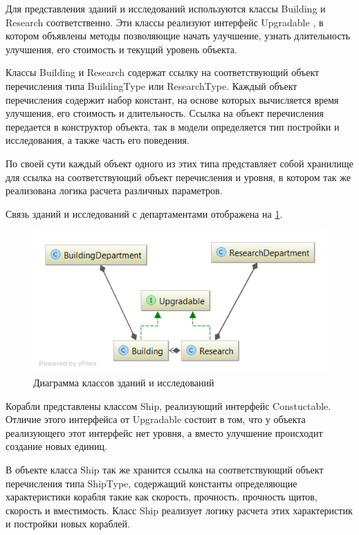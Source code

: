 Для представления зданий и исследований используются классы Building  и Research  соответственно. Эти классы реализуют интерфейс Upgradable , в котором объявлены методы позволяющие начать улучшение, узнать длительность улучшения, его стоимость и текущий уровень объекта.

Классы Building и Research содержат ссылку на соответствующий объект перечисления типа BuildingType   или
 ResearchType. Каждый объект перечисления содержит набор констант, на основе которых вычисляется время улучшения, его стоимость и длительность. Ссылка на объект перечисления передается в конструктор объекта, так в модели определяется тип постройки и исследования, а также часть его поведения.

По своей сути каждый объект одного из этих типа представляет собой хранилище для ссылка на соответствующий объект перечисления и уровня, в котором так же реализована логика расчета различных параметров. 

Связь зданий и исследований с департаментами отображена на \ref{pic:d4}.

\begin{figure}[H]
\centering
\includegraphics[scale=0.5]{diagram4.png}
\caption{Диаграмма классов зданий и исследований}
\label{pic:d4}
\end{figure}

Корабли представлены классом Ship, реализующий интерфейс Constuctable. Отличие этого интерфейса от Upgradable состоит в том, что у объекта реализующего этот интерфейс нет уровня, а вместо улучшение происходит создание новых единиц.

В объекте класса Ship так же хранится ссылка на соответствующий объект перечисления типа ShipType, содержащий константы определяющие характеристики корабля такие как скорость, прочность, прочность щитов, скорость и вместимость. Класс Ship реализует логику расчета этих характеристик и постройки новых кораблей.

